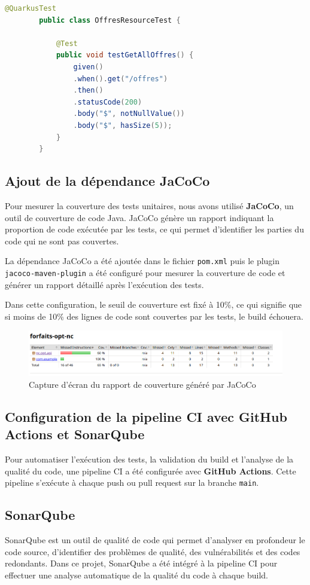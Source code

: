 \documentclass{article}
\begin{document}
	\begin{lstlisting}[language=Java]
		@QuarkusTest
		public class OffresResourceTest {
			
			@Test
			public void testGetAllOffres() {
				given()
				.when().get("/offres")
				.then()
				.statusCode(200)
				.body("$", notNullValue())
				.body("$", hasSize(5));
			}
		}
	\end{lstlisting}
	
	\subsection{Ajout de la dépendance JaCoCo}
	Pour mesurer la couverture des tests unitaires, nous avons utilisé \textbf{JaCoCo}, un outil de couverture de code Java. JaCoCo génère un rapport indiquant la proportion de code exécutée par les tests, ce qui permet d'identifier les parties du code qui ne sont pas couvertes.
	
	La dépendance JaCoCo a été ajoutée dans le fichier \texttt{pom.xml} puis le plugin \texttt{jacoco-maven-plugin} a été configuré pour mesurer la couverture de code et générer un rapport détaillé après l'exécution des tests.
	
	Dans cette configuration, le seuil de couverture est fixé à 10\%, ce qui signifie que si moins de 10\% des lignes de code sont couvertes par les tests, le build échouera.
	
	\begin{figure}[h!]
		\centering
		\includegraphics[width=\textwidth]{asset/jacoco.png}
		\caption{Capture d'écran du rapport de couverture généré par JaCoCo}
		\label{fig:jacoco-report}
	\end{figure}
	
	\subsection{Configuration de la pipeline CI avec GitHub Actions et SonarQube}
	Pour automatiser l'exécution des tests, la validation du build et l'analyse de la qualité du code, une pipeline CI a été configurée avec \textbf{GitHub Actions}. Cette pipeline s'exécute à chaque push ou pull request sur la branche \texttt{main}.
	
	\subsection{SonarQube}
	SonarQube est un outil de qualité de code qui permet d'analyser en profondeur le code source, d'identifier des problèmes de qualité, des vulnérabilités et des codes redondants. Dans ce projet, SonarQube a été intégré à la pipeline CI pour effectuer une analyse automatique de la qualité du code à chaque build.
	
\end{document}
